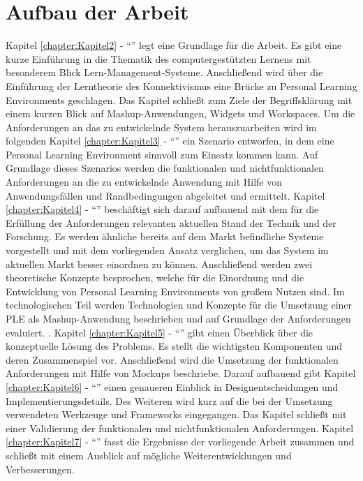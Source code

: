 \section{Aufbau der Arbeit}
Kapitel \ref{chapter:Kapitel2} - "`"' legt eine Grundlage für die Arbeit. Es gibt eine kurze Einführung in die Thematik des computergestützten Lernens mit besonderem Blick Lern-Management-Systeme. Anschließend wird über die Einführung der Lerntheorie des Konnektivismus eine Brücke zu Personal Learning Environments geschlagen. Das Kapitel schließt zum Ziele der Begriffsklärung mit einem kurzen Blick auf Mashup-Anwendungen, Widgets und Workspaces. Um die Anforderungen an das zu entwickelnde System herauszuarbeiten wird im folgenden Kapitel \ref{chapter:Kapitel3} - "`"' ein Szenario entworfen, in dem eine Personal Learning Environment sinnvoll zum Einsatz kommen kann. Auf Grundlage dieses Szenarios werden die funktionalen und nichtfunktionalen Anforderungen an die zu entwickelnde Anwendung mit Hilfe von Anwendungsfällen und Randbedingungen abgeleitet und ermittelt. Kapitel \ref{chapter:Kapitel4} - "`"' beschäftigt sich darauf aufbauend mit dem für die Erfüllung der Anforderungen relevanten aktuellen Stand der Technik und der Forschung. Es werden ähnliche bereits auf dem Markt befindliche Systeme vorgestellt und mit dem vorliegenden Ansatz verglichen, um das System im aktuellen Markt besser einordnen zu können. Anschließend werden zwei theoretische Konzepte besprochen, welche für die Einordnung und die Entwicklung von Personal Learning Environments von großem Nutzen sind. Im technologischen Teil werden Technologien und Konzepte für die Umsetzung einer PLE als Mashup-Anwendung beschrieben und auf Grundlage der Anforderungen evaluiert.  . Kapitel \ref{chapter:Kapitel5} - "`"' gibt einen Überblick über die konzeptuelle Lösung des Problems. Es stellt die wichtigsten Komponenten und deren Zusammenspiel vor. Anschließend wird die Umsetzung der funktionalen Anforderungen mit Hilfe von Mockups beschriebe. Darauf aufbauend gibt Kapitel \ref{chapter:Kapitel6} - "`"' einen genaueren Einblick in Designentscheidungen und Implementierungsdetails. Des Weiteren wird kurz auf die bei der Umsetzung verwendeten Werkzeuge und Frameworks eingegangen. Das Kapitel schließt mit einer Validierung der funktionalen und nichtfunktionalen Anforderungen. Kapitel \ref{chapter:Kapitel7} - "`"' fasst die Ergebnisse der vorliegende Arbeit zusammen und schließt mit einem Ausblick auf mögliche Weiterentwicklungen und Verbesserungen.
